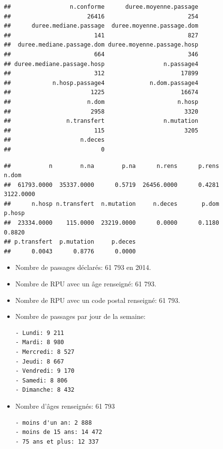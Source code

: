 \documentclass[]{article}
\begin{document}
\begin{verbatim}
##                 n.conforme      duree.moyenne.passage 
##                      26416                        254 
##      duree.mediane.passage  duree.moyenne.passage.dom 
##                        141                        827 
##  duree.mediane.passage.dom duree.moyenne.passage.hosp 
##                        664                        346 
## duree.mediane.passage.hosp                 n.passage4 
##                        312                      17899 
##            n.hosp.passage4             n.dom.passage4 
##                       1225                      16674 
##                      n.dom                     n.hosp 
##                       2958                       3320 
##                n.transfert                 n.mutation 
##                        115                       3205 
##                    n.deces 
##                          0
\end{verbatim}

\begin{verbatim}
##           n        n.na        p.na      n.rens      p.rens       n.dom 
##  61793.0000  35337.0000      0.5719  26456.0000      0.4281   3122.0000 
##      n.hosp n.transfert  n.mutation     n.deces       p.dom      p.hosp 
##  23334.0000    115.0000  23219.0000      0.0000      0.1180      0.8820 
## p.transfert  p.mutation     p.deces 
##      0.0043      0.8776      0.0000
\end{verbatim}

\begin{itemize}
\item
  Nombre de passages déclarés: 61 793 en 2014.
\item
  Nombre de RPU avec un âge renseigné: 61 793.
\item
  Nombre de RPU avec un code postal renseigné: 61 793.
\item
  Nombre de passages par jour de la semaine:

\begin{verbatim}
- Lundi: 9 211
- Mardi: 8 980
- Mercredi: 8 527
- Jeudi: 8 667
- Vendredi: 9 170
- Samedi: 8 806
- Dimanche: 8 432
\end{verbatim}
\item
  Nombre d'âges renseignés: 61 793

\begin{verbatim}
- moins d'un an: 2 888
- moins de 15 ans: 14 472
- 75 ans et plus: 12 337
\end{verbatim}
\end{itemize}
\end{document}
